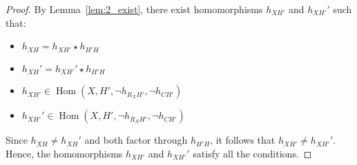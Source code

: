 \begin{proof}
   By Lemma~\ref{lem:2_exist}, there exist homomorphisms \( h_{XH'} \) and \( h_{XH'}' \) such that:
   \begin{itemize}
       \item \( h_{XH} = h_{XH'} \star h_{H'H} \)
       \item \( h_{XH}' = h_{XH'}' \star h_{H'H} \)
       \item \( h_{XH'} \in \operatorname{Hom}(X, H', \lnot h_{R_XH'}, \lnot h_{CH'}) \)
       \item \( h_{XH'}' \in \operatorname{Hom}(X, H', \lnot h_{R_XH'}, \lnot h_{CH'}) \)
   \end{itemize}
    
   Since \( h_{XH} \neq h_{XH}' \) and both factor through \( h_{H'H} \), it follows that \( h_{XH'} \neq h_{XH'}' \). Hence, the homomorphisms \( h_{XH'} \) and \( h_{XH'}' \) satisfy all the conditions.
\end{proof}